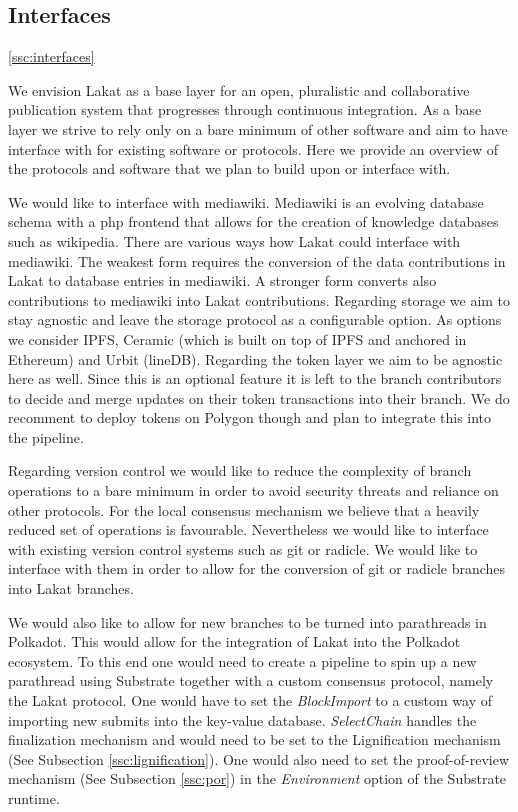 \subsection{Interfaces}
\ref{ssc:interfaces}

We envision Lakat as a base layer for an open, pluralistic and collaborative publication system that progresses through continuous integration. As a base layer we strive to rely only on a bare minimum of other software and aim to have interface with for existing software or protocols. Here we provide an overview of the protocols and software that we plan to build upon or interface with.

We would like to interface with mediawiki. Mediawiki is an evolving database schema with a php frontend that allows for the creation of knowledge databases such as wikipedia. There are various ways how Lakat could interface with mediawiki. The weakest form requires the conversion of the data contributions in Lakat to database entries in mediawiki. A stronger form converts also contributions to mediawiki into Lakat contributions. Regarding storage we aim to stay agnostic and leave the storage protocol as a configurable option. As options we consider IPFS, Ceramic (which is built on top of IPFS and anchored in Ethereum) and Urbit (lineDB). Regarding the token layer we aim to be agnostic here as well. Since this is an optional feature it is left to the branch contributors to decide and merge updates on their token transactions into their branch. We do recomment to deploy tokens on Polygon though and plan to integrate this into the pipeline.

Regarding version control we would like to reduce the complexity of branch operations to a bare minimum in order to avoid security threats and reliance on other protocols. For the local consensus mechanism we believe that a heavily reduced set of operations is favourable. Nevertheless we would like to interface with existing version control systems such as git or radicle. We would like to interface with them in order to allow for the conversion of git or radicle branches into Lakat branches.

We would also like to allow for new branches to be turned into parathreads in Polkadot. This would allow for the integration of Lakat into the Polkadot ecosystem. To this end one would need to create a pipeline to spin up a new parathread using Substrate together with a custom consensus protocol, namely the Lakat protocol. One would have to set the \textit{BlockImport} to a custom way of importing new submits into the key-value database. \textit{SelectChain} handles the finalization mechanism and would need to be set to the Lignification mechanism (See Subsection \ref{ssc:lignification}). One would also need to set the proof-of-review mechanism (See Subsection \ref{ssc:por}) in the \textit{Environment} option of the Substrate runtime.
